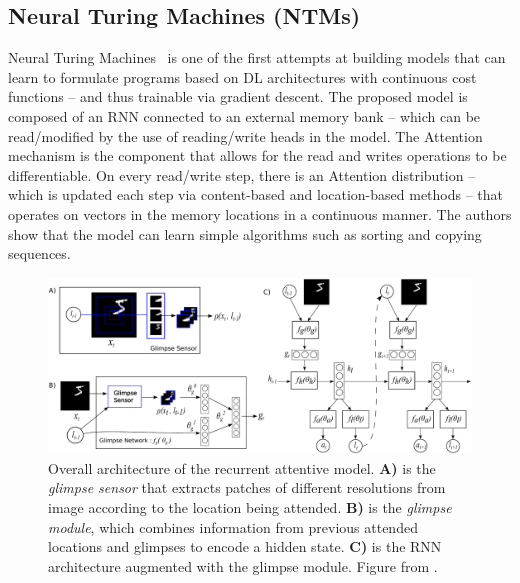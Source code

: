 \documentclass[12pt]{article}
\begin{document}
\subsection{Neural Turing Machines (NTMs)}
Neural Turing Machines~\cite{ref:ntm} is one of the first attempts at building models that can learn to
formulate programs based on DL architectures with continuous cost functions
-- and thus trainable via gradient descent.
The proposed model is composed of an RNN connected to an external memory bank -- which can be read/modified
by the use of reading/write heads in the model.
The Attention mechanism is the component that allows for the read and writes operations to be differentiable.
On every read/write step, there is an Attention distribution
-- which is updated each step via content-based and location-based methods --
that operates on vectors in the memory locations in a continuous manner.
The authors show that the model can learn simple algorithms such as sorting and copying sequences.

\begin{figure}
\begin{center}
    \includegraphics[width=1.0\linewidth]{./img/recurr_model.png}
\caption{
    Overall architecture of the recurrent attentive model.
    \textbf{A)} is the \emph{glimpse sensor} that extracts patches of different resolutions from image
    according to the location being attended.
    \textbf{B)} is the \emph{glimpse module}, which combines information from previous attended locations
    and glimpses to encode a hidden state.
    \textbf{C)} is the RNN architecture augmented with the glimpse module.
    Figure from \cite{ref:rec-models}.
}
\label{fig:recurr-model}
\end{center}
\end{figure}
\end{document}
